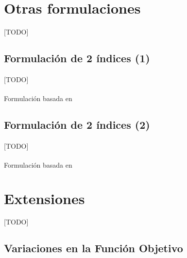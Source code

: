 \documentclass{subfiles}
\begin{document}
    \section{Otras formulaciones}
    \label{sec:formulation_other_formulations}

      \paragraph{}
      [TODO]

      \subsection{Formulación de 2 índices (1)}
      \label{sec:formulation_two_index_1_formulation}

        \paragraph{}
        [TODO]

        \paragraph{}
        Formulación basada en \cite{ropke2007models}

        \subsection{Formulación de 2 índices (2)}
      \label{sec:formulation_two_index_2_formulation}

        \paragraph{}
        [TODO]

        \paragraph{}
        Formulación basada en \cite{ropke2007models}

    \section{Extensiones}
    \label{sec:formulation_extensions}
      [TODO]

      \subsection{Variaciones en la Función Objetivo}
      \label{sec:formulation_extensions_objective_functions}
\end{document}
